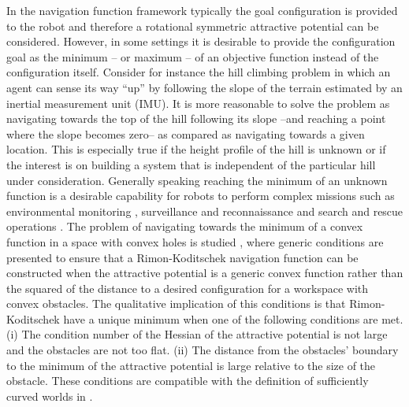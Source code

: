 \documentclass[article]{IEEEtran}
\theoremstyle{definition}
\begin{document}
%
\begin{comment}
\red{Efforts in trying to implement local solutions Nombrar el paper de Omur: Exact robot navigation using power diagrams. Local, pero hay que resolver el problem de optimization todo el tiempo. Agregar esos papeprs horribles que dijo Omur sobre local obstacles } 
\end{comment}

In the navigation function framework typically the goal configuration is provided to the robot and therefore a rotational symmetric attractive potential can be considered. However, in some settings it is desirable to provide the configuration goal as the minimum -- or maximum -- of an objective function instead of the configuration itself. Consider for instance the hill climbing problem in which an agent can sense its way ``up'' by following the slope of the terrain estimated by an inertial measurement unit (IMU). It is more reasonable to solve the problem as navigating towards the top of the hill following its slope --and reaching a point where the slope becomes zero-- as compared as navigating towards a given location. This is especially true if the height profile of the hill is unknown or if the interest is on building a system that is independent of the particular hill under consideration. Generally speaking reaching the minimum of an unknown function is a desirable capability for robots to perform complex missions such as environmental monitoring \cite{ogren2004cooperative,sukhatme2007design}, surveillance and reconnaissance \cite{rybski2000team} and search and rescue operations \cite{kumar2004robot}. The problem of navigating towards the minimum of a convex function in a space with convex holes is studied \cite{PaternainEtal15}, where generic conditions are presented to ensure that a Rimon-Koditschek navigation function can be constructed when the attractive potential is a generic convex function rather than the squared of the distance to a desired configuration for a workspace with convex obstacles. The qualitative implication of this conditions is that Rimon-Koditschek have a unique minimum when one of the following conditions are met. (i) The condition number of the Hessian of the attractive potential is not large and the obstacles are not too flat. (ii) The distance from the obstacles' boundary to the minimum of the attractive potential is large relative to the size of the obstacle. These conditions are compatible with the definition of sufficiently curved worlds in \cite{filippidis2012navigation}.    
 
\end{document}
